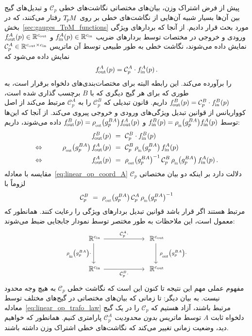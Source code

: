 پیش از فرض اشتراک وزن، بیان‌های مختصاتی نگاشت‌های خطی $\mathcal{C}_p$ و تبدیل‌های گیج بین آن‌ها بسیار شبیه آن‌هایی از نگاشت‌های خطی بر روی $T_{\mkern-1.5mu p}\mkern-.5muM$ رفتار می‌کنند، که در بخش~\ref{sec:gauges_TpM_functions} مورد بحث قرار دادیم.
از آنجا که بردارهای ویژگی ورودی و خروجی در مختصات توسط بردارهای ضریب $f_\textup{\;\!\!in}^A(p) \in \mathbb{R}^{{c_\textup{in}}}$ و $f_\textup{\:\!\!out}^A(p) \in \mathbb{R}^{{c_\textup{out}}}$ نمایش داده می‌شوند، نگاشت خطی به طور طبیعی توسط آن ماتریس $\mathcal{C}_p^A \in \mathbb{R}^{{c_\textup{out}}\times{c_\textup{in}}}$ نمایش داده می‌شود که
\begin{align}\label{eq:linear_op_coord_A}
	f_\textup{\:\!\!out}^A(p) = \mathcal{C}_p^A \cdot f_\textup{\;\!\!in}^A(p) \,.
\end{align}
را برآورده می‌کند.
این رابطه البته برای مختصات‌بندی‌های دلخواه برقرار است، به طوری که برای هر گیج دیگری که با $B$ برچسب گذاری شده است، $f_\textup{\:\!\!out}^B(p) = \mathcal{C}_p^B \cdot f_\textup{\;\!\!in}^B(p)$ داریم.
قانون تبدیلی که $\mathcal{C}_p^B$ را به $\mathcal{C}_p^A$ مرتبط می‌کند از اصل کوواریانس از قوانین تبدیل ویژگی‌های ورودی و خروجی پیروی می‌کند.
از آنجا که این‌ها توسط $\fin^B(p) = \rhoin\big( g_p^{BA}\big) \fin^A(p)$ و $\fout^B(p) = \rhoout\big( g_p^{BA}\big) \fout^A(p)$ داده می‌شوند، داریم:
\begin{alignat}{3}
	&& \fout^B(p)\ &=\ \mathcal{C}_p^B \cdot \fin^B(p)
	\notag \\ \Leftrightarrow \qquad
	&& \rhoout\big( g_p^{BA}\big)\, \fout^A(p)\ &=\ \mathcal{C}_p^B\, \rhoin\big( g_p^{BA}\big)\, \fin^A(p)
	\notag \\ \Leftrightarrow \qquad
	&& \fout^A(p)\ &=\ \rhoout\big( g_p^{BA}\big)^{-1}\, \mathcal{C}_p^B\, \rhoin\big( g_p^{BA}\big)\, \fin^A(p) \,.
\end{alignat}
مقایسه با معادله~\eqref{eq:linear_op_coord_A} دلالت دارد بر اینکه دو بیان مختصاتی $\mathcal{C}_p$ لزوماً با
\begin{align}\label{eq:linear_op_trafo_law}
	\mathcal{C}_p^B\ =\ \rhoout\big( g_p^{BA}\big)\, \mathcal{C}_p^A\, \rhoin\big( g_p^{BA}\big)^{-1}
\end{align}
مرتبط هستند اگر قرار باشد قوانین تبدیل بردارهای ویژگی را رعایت کنند.
همانطور که معمول است، این ملاحظات به طور مختصر توسط نمودار جابجایی ضبط می‌شوند:
\begin{equation}\label{cd:linear_op_trafo_law}
	\begin{tikzcd}[column sep=60pt, row sep=30pt, font=\normalsize]
		\R^{\cin}
		\arrow[d, "\rhoin\big(g_p^{BA}\big)\cdot\,"']
		\arrow[r, "\mathcal{C}_p^A \cdot"]
		&
		\R^{\cout}
		\arrow[d, "\ \rhoout\big(g_p^{BA}\big) \cdot"]
		\\
		\R^{\cin}
		\arrow[r, "\mathcal{C}_p^B \cdot"']
		&
		\R^{\cout}
	\end{tikzcd}
\end{equation}
مفهوم عملی مهم این نتیجه تا کنون این است که نگاشت خطی $\mathcal{C}_p$ به هیچ وجه محدود نیست.
به بیان دیگر: تا زمانی که بیان‌های مختصاتی در گیج‌های مختلف توسط معادله~\eqref{eq:linear_op_trafo_law} مرتبط باشند، آزاد هستیم که $\mathcal{C}_p$ را در یک گیج دلخواه ثابت $A$ توسط ماتریس \emph{بدون محدودیت} $\mathcal{C}_p^A$ پارامتری کنیم.
همانطور که خواهیم دید، وضعیت زمانی تغییر می‌کند که نگاشت‌های خطی اشتراک وزن داشته باشند.


